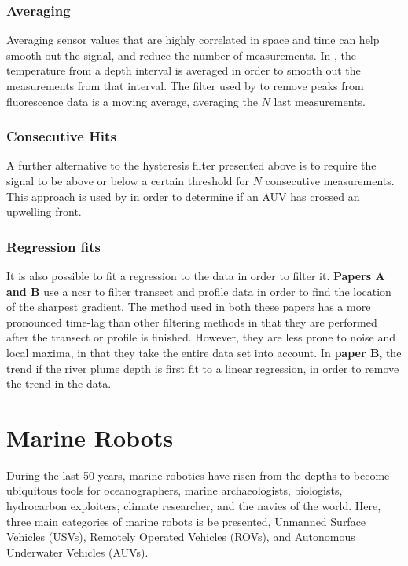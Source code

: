 \subsubsection*{Averaging}
Averaging sensor values that are highly correlated in space and time can help smooth out the signal, and reduce the number of measurements. In \textcite{fossum2021adaptive}, the temperature from a depth interval is averaged in order to smooth out the measurements from that interval. The filter used by \textcite{zhang2011peak} to remove peaks from fluorescence data is a moving average, averaging the $N$ last measurements.

\subsubsection*{Consecutive Hits}
A further alternative to the hysteresis filter presented above is to require the signal to be above or below a certain threshold for $N$ consecutive measurements. This approach is used by \textcite{zhang2016autonomous} in order to determine if an AUV has crossed an upwelling front. 

\subsubsection*{Regression fits}
It is also possible to fit a regression to the data in order to filter it. \textbf{Papers A and B} use a \acrshort{ncsr} to filter transect and profile data in order to find the location of the sharpest gradient. The method used in both these papers has a more pronounced time-lag than other filtering methods in that they are performed after the transect or profile is finished. However, they are less prone to noise and local maxima, in that they take the entire data set into account. In \textbf{paper B}, the trend if the river plume depth is first fit to a linear regression, in order to remove the trend in the data. 


\section{Marine Robots}
During the last 50 years, marine robotics have risen from the depths to become ubiquitous tools for oceanographers, marine archaeologists, biologists, hydrocarbon exploiters, climate researcher, and the navies of the world. Here, three main categories of marine robots is be presented, Unmanned Surface Vehicles (USVs), Remotely Operated Vehicles (ROVs), and Autonomous Underwater Vehicles (AUVs). 


